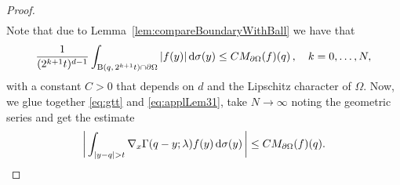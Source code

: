 \begin{proof}
\begin{align}
  \end{align}
  Note that due to Lemma~\ref{lem:compareBoundaryWithBall} we have that
  \begin{align}
    \label{eq:applLem31}
    \frac{1}{(2^{k+1} t)^{d - 1}} \int_{\mathrm{B}(q,\, 2^{k + 1}t) \cap \partial \Omega}  |f(y)| \, {\operatorname{d}\!{\sigma}}(y)
    \leq C M_{\partial\Omega}(f)(q)\,, \quad k=0,\dots,N, 
  \end{align}
  with a constant $C > 0$ that depends on $d$ and the Lipschitz character of $\Omega$.
  Now, we glue together \eqref{eq:gtt} and \eqref{eq:applLem31}, take $N \to \infty$ noting the geometric series and get the estimate
  \begin{align}
    \label{eq:finalgtt}
    \bigg| \int_{|y - q| > t} \nabla_x \Gamma(q - y; \lambda) f(y) \, {\operatorname{d}\!{\sigma}}(y) \,\bigg|
    \leq C M_{\partial\Omega}(f)(q).
  \end{align}


\end{proof}
